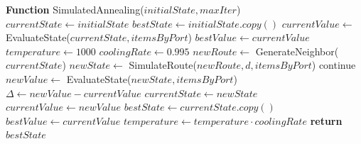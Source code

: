 \documentclass[12pt, a4paper]{article}
\begin{document}
\begin{algorithmic}[1]
\STATE \textbf{Function} SimulatedAnnealing($initialState, maxIter$)
\STATE $currentState \gets initialState$
\STATE $bestState \gets initialState.copy()$
\STATE $currentValue \gets$ EvaluateState($currentState, itemsByPort$)
\STATE $bestValue \gets currentValue$
\STATE $temperature \gets 1000$
\STATE $coolingRate \gets 0.995$
    \STATE $newRoute \gets$ GenerateNeighbor($currentState$)
    \STATE $newState \gets$ SimulateRoute($newRoute, d, itemsByPort$)
        \STATE continue
    \ENDIF
    \STATE $newValue \gets$ EvaluateState($newState, itemsByPort$)
    \STATE $\Delta \gets newValue - currentValue$
        \STATE $currentState \gets newState$
        \STATE $currentValue \gets newValue$
            \STATE $bestState \gets currentState.copy()$
            \STATE $bestValue \gets currentValue$
        \ENDIF
    \ENDIF
    \STATE $temperature \gets temperature \cdot coolingRate$
\ENDFOR
\STATE \textbf{return} $bestState$

\end{algorithmic}
\end{document}
